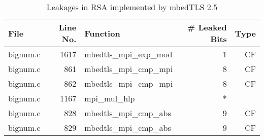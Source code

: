 \begin{table}[h!]
\centering\tiny\scriptsize
\caption{Leakages in RSA implemented by mbedTLS 2.5}\label{tab:RSAmbedTLS2.5}
\begin{tabular}{lrlrr}
\hline
\textbf{File} & \textbf{Line No.} & \textbf{Function} & \textbf{\# Leaked Bits} & \textbf{Type} \\\hline
bignum.c& 1617&mbedtls\_mpi\_exp\_mod&1 &CF\\
bignum.c& 861&mbedtls\_mpi\_cmp\_mpi&8 &CF\\
bignum.c& 862&mbedtls\_mpi\_cmp\_mpi&8 &CF\\
bignum.c& 1167&mpi\_mul\_hlp&*&\\
bignum.c& 828&mbedtls\_mpi\_cmp\_abs&9 &CF\\
bignum.c& 829&mbedtls\_mpi\_cmp\_abs&9 &CF\\
\hline
\end{tabular}
\renewcommand{\baselinestretch}{1.0}\selectfont
\end{table}
